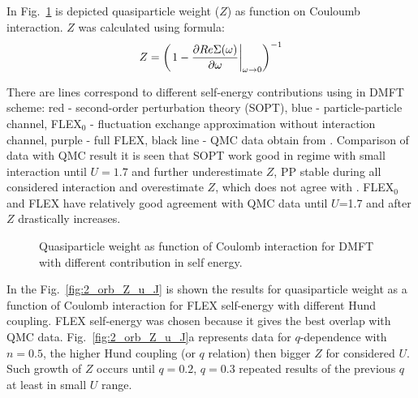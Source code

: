 In Fig.~\ref{fig:2_orb_Z_u} is depicted quasiparticle weight ($Z$) as function on Couloumb interaction. $Z$ was calculated using formula:
\begin{equation}
Z={\left( \left. 1-{\partial Re \Sigma(\omega) \over \partial \omega}\right|_{\omega \to 0}\right)}^{-1}
\end{equation}

There are lines correspond to different self-energy contributions using in DMFT scheme: red - second-order perturbation theory (SOPT), blue - particle-particle channel, FLEX${_0}$ - fluctuation exchange approximation without interaction channel, purple - full FLEX, black line - QMC data obtain from \citep{2005JPCM...17...61D}. Comparison of data with QMC result it is seen that SOPT work good in regime with small interaction until $U=1.7$ and further underestimate $Z$, PP stable during all considered interaction and overestimate $Z$, which does not agree with \citep{2005JPCM...17...61D}. FLEX$_0$ and FLEX have relatively good agreement with QMC data until $U$=1.7 and after $Z$ drastically increases.
\begin{figure}[h!]
\caption{Quasiparticle weight as function of Coulomb interaction for DMFT with different contribution in self energy.}
\label{fig:2_orb_Z_u}
\end{figure}

In the Fig.~\ref{fig:2_orb_Z_u_J} is shown the results for quasiparticle weight as a function of Coulomb interaction for FLEX self-energy with different Hund coupling. FLEX self-energy was chosen because it gives the best overlap with QMC data. Fig.~\ref{fig:2_orb_Z_u_J}a represents data for $q$-dependence with $n=0.5$, the higher Hund coupling (or $q$ relation) then bigger $Z$ for considered $U$. Such growth of $Z$ occurs until $q=0.2$, $q=0.3$ repeated results of the previous $q$ at least in small $U$ range.

